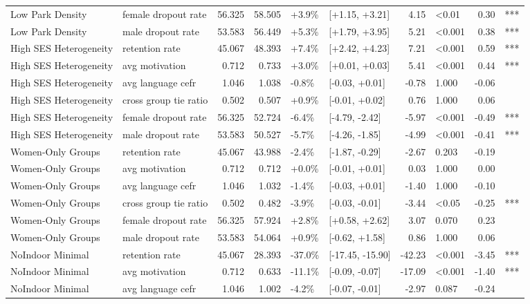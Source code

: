 \begin{longtable}[t]{llrrllrlrl}
Low Park Density & female dropout rate & 56.325 & 58.505 & +3.9\% & {}[+1.15, +3.21] & 4.15 & <0.01 & 0.30 & ***\\
Low Park Density & male dropout rate & 53.583 & 56.449 & +5.3\% & {}[+1.79, +3.95] & 5.21 & <0.001 & 0.38 & ***\\
\addlinespace
High SES Heterogeneity & retention rate & 45.067 & 48.393 & +7.4\% & {}[+2.42, +4.23] & 7.21 & <0.001 & 0.59 & ***\\
High SES Heterogeneity & avg motivation & 0.712 & 0.733 & +3.0\% & {}[+0.01, +0.03] & 5.41 & <0.001 & 0.44 & ***\\
High SES Heterogeneity & avg language cefr & 1.046 & 1.038 & -0.8\% & {}[-0.03, +0.01] & -0.78 & 1.000 & -0.06 & \\
High SES Heterogeneity & cross group tie ratio & 0.502 & 0.507 & +0.9\% & {}[-0.01, +0.02] & 0.76 & 1.000 & 0.06 & \\
High SES Heterogeneity & female dropout rate & 56.325 & 52.724 & -6.4\% & {}[-4.79, -2.42] & -5.97 & <0.001 & -0.49 & ***\\
\addlinespace
High SES Heterogeneity & male dropout rate & 53.583 & 50.527 & -5.7\% & {}[-4.26, -1.85] & -4.99 & <0.001 & -0.41 & ***\\
Women-Only Groups & retention rate & 45.067 & 43.988 & -2.4\% & {}[-1.87, -0.29] & -2.67 & 0.203 & -0.19 & \\
Women-Only Groups & avg motivation & 0.712 & 0.712 & +0.0\% & {}[-0.01, +0.01] & 0.03 & 1.000 & 0.00 & \\
Women-Only Groups & avg language cefr & 1.046 & 1.032 & -1.4\% & {}[-0.03, +0.01] & -1.40 & 1.000 & -0.10 & \\
Women-Only Groups & cross group tie ratio & 0.502 & 0.482 & -3.9\% & {}[-0.03, -0.01] & -3.44 & <0.05 & -0.25 & ***\\
\addlinespace
Women-Only Groups & female dropout rate & 56.325 & 57.924 & +2.8\% & {}[+0.58, +2.62] & 3.07 & 0.070 & 0.23 & \\
Women-Only Groups & male dropout rate & 53.583 & 54.064 & +0.9\% & {}[-0.62, +1.58] & 0.86 & 1.000 & 0.06 & \\
NoIndoor Minimal & retention rate & 45.067 & 28.393 & -37.0\% & {}[-17.45, -15.90] & -42.23 & <0.001 & -3.45 & ***\\
NoIndoor Minimal & avg motivation & 0.712 & 0.633 & -11.1\% & {}[-0.09, -0.07] & -17.09 & <0.001 & -1.40 & ***\\
NoIndoor Minimal & avg language cefr & 1.046 & 1.002 & -4.2\% & {}[-0.07, -0.01] & -2.97 & 0.087 & -0.24 & \\

\end{longtable}
